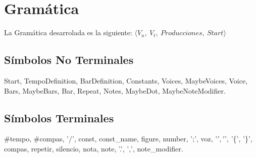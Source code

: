 \section{Gramática}

La Gramática desarrolada es la siguiente: $\langle V_n,\ V_t,\ Producciones,\ Start \rangle$

\subsection{Símbolos No Terminales}

Start, TempoDefinition, BarDefinition, Constants, Voices, MaybeVoices, Voice, Bars, MaybeBars, Bar, Repeat, Notes, MaybeDot, MaybeNoteModifier.

\subsection{Símbolos Terminales}

#tempo, #compas, '/', const, const_name, figure, number, ';', voz, '\(', '\)', '\{', '\}', compas, repetir, silencio, nota, note, '.', ',', note_modifier.

